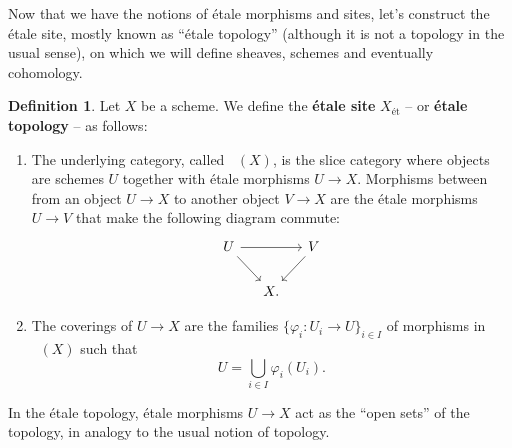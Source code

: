 \documentclass{report}
\DeclareMathOperator{\Et}{\acute{E}t}
\theoremstyle{definition}
\newtheorem{definition}[theorem]{Definition}
\begin{document}
Now that we have the notions of \'{e}tale morphisms and sites, let's construct the \'{e}tale site, mostly known as ``\'{e}tale topology'' (although it is not a topology in the usual sense), on which we will define sheaves, schemes and eventually cohomology.

\begin{definition}
Let $X$ be a scheme. We define the \textbf{\'{e}tale site} $X_{\text{\'{e}t}}$ -- or \textbf{\'{e}tale topology} -- as follows:
\begin{enumerate}
\item The underlying category, called $\Et(X)$, is the slice category where objects are schemes $U$ together with \'{e}tale morphisms $U\rightarrow X$. Morphisms between from an object $U\rightarrow X$ to another object $V\rightarrow X$ are the \'{e}tale morphisms $U\rightarrow V$ that make the following diagram commute:
\[
\begin{tikzcd}[column sep=small]
U\arrow[rr]\arrow[rd]&&V\arrow[ld]\\
&X.
\end{tikzcd}
\]

\item The coverings of $U\rightarrow X$ are the families $\{\varphi_i:U_i\rightarrow U\}_{i\in I}$ of morphisms in $\Et(X)$ such that
\[U=\bigcup_{i\in I}\varphi_i(U_i).\]
\end{enumerate}
\end{definition}
In the \'{e}tale topology, \'{e}tale morphisms $U\rightarrow X$ act as the ``open sets'' of the topology, in analogy to the usual notion of topology.
\end{document}
